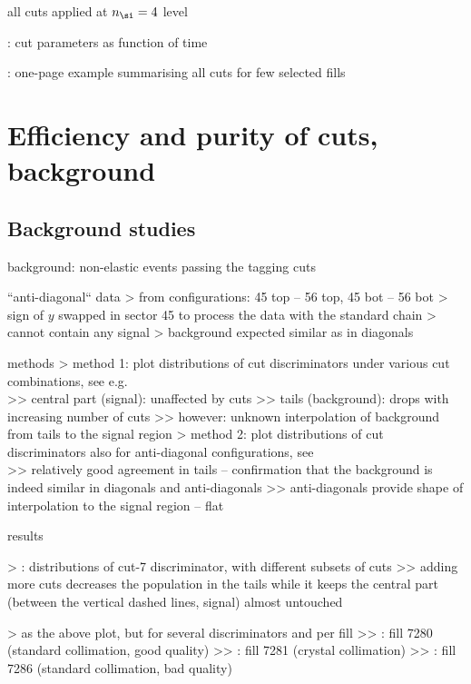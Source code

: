\> all cuts applied at $n_\si = 4$ level

\>  : cut parameters as function of time

\> : one-page example summarising all cuts for few selected fills



\chapter[cut-eff-bckg]{Efficiency and purity of cuts, background}

\section{Background studies}

\> background: non-elastic events passing the tagging cuts

\> ``anti-diagonal`` data
\>> from configurations: 45 top -- 56 top, 45 bot -- 56 bot
\>> sign of $y$ swapped in sector 45 to process the data with the standard chain
\>> cannot contain any signal
\>> background expected similar as in diagonals

\> methods
\>> method 1: plot distributions of cut discriminators under various cut combinations, see e.g.\\ 
\>>> central part (signal): unaffected by cuts
\>>> tails (background): drops with increasing number of cuts
\>>> however: unknown interpolation of background from tails to the signal region
\>> method 2: plot distributions of cut discriminators also for anti-diagonal configurations, see\\ 
\>>> relatively good agreement in tails -- confirmation that the background is indeed similar in diagonals and anti-diagonals
\>>> anti-diagonals provide shape of interpolation to the signal region -- flat

\> results

\>> : distributions of cut-7 discriminator, with different subsets of cuts
\>>> adding more cuts decreases the population in the tails while it keeps the central part (between the vertical dashed lines, signal) almost untouched

\>> as the above plot, but for several discriminators and per fill
\>>> : fill 7280 (standard collimation, good quality)
\>>> : fill 7281 (crystal collimation)
\>>> : fill 7286 (standard collimation, bad quality)

